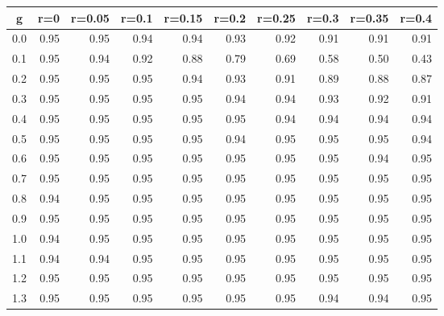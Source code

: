 %
\begin{table}[!tbp]
 \begin{center}
 \begin{tabular}{rrrrrrrrrr}\hline\hline
\multicolumn{1}{c}{g}&\multicolumn{1}{c}{r=0}&\multicolumn{1}{c}{r=0.05}&\multicolumn{1}{c}{r=0.1}&\multicolumn{1}{c}{r=0.15}&\multicolumn{1}{c}{r=0.2}&\multicolumn{1}{c}{r=0.25}&\multicolumn{1}{c}{r=0.3}&\multicolumn{1}{c}{r=0.35}&\multicolumn{1}{c}{r=0.4}\tabularnewline
\hline
0.0&0.95&0.95&0.94&0.94&0.93&0.92&0.91&0.91&0.91\tabularnewline
0.1&0.95&0.94&0.92&0.88&0.79&0.69&0.58&0.50&0.43\tabularnewline
0.2&0.95&0.95&0.95&0.94&0.93&0.91&0.89&0.88&0.87\tabularnewline
0.3&0.95&0.95&0.95&0.95&0.94&0.94&0.93&0.92&0.91\tabularnewline
0.4&0.95&0.95&0.95&0.95&0.95&0.94&0.94&0.94&0.94\tabularnewline
0.5&0.95&0.95&0.95&0.95&0.94&0.95&0.95&0.95&0.94\tabularnewline
0.6&0.95&0.95&0.95&0.95&0.95&0.95&0.95&0.94&0.95\tabularnewline
0.7&0.95&0.95&0.95&0.95&0.95&0.95&0.95&0.95&0.95\tabularnewline
0.8&0.94&0.95&0.95&0.95&0.95&0.95&0.95&0.95&0.95\tabularnewline
0.9&0.95&0.95&0.95&0.95&0.95&0.95&0.95&0.95&0.95\tabularnewline
1.0&0.94&0.95&0.95&0.95&0.95&0.95&0.95&0.95&0.95\tabularnewline
1.1&0.94&0.94&0.95&0.95&0.95&0.95&0.95&0.95&0.95\tabularnewline
1.2&0.95&0.95&0.95&0.95&0.95&0.95&0.95&0.95&0.95\tabularnewline
1.3&0.95&0.95&0.95&0.95&0.95&0.95&0.94&0.94&0.95\tabularnewline
\hline
\end{tabular}

\end{center}

\end{table}

